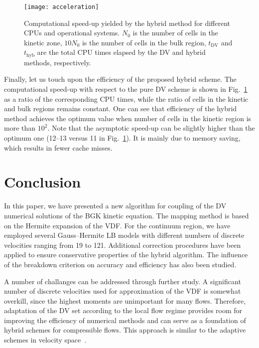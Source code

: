 \documentclass[]{elsarticle} %
\begin{document}
\begin{figure}
    \centering
    \texttt{[image: acceleration]}
    \caption{
        Computational speed-up yielded by the hybrid method for different CPUs and operational systems.
        $N_0$ is the number of cells in the kinetic zone, $10N_0$ is the number of cells in the bulk region,
        $t_\mathrm{DV}$ and $t_\mathrm{hyb}$ are the total CPU times elapsed by the DV and hybrid methods, respectively.
    }\label{fig:speed-up}
\end{figure}

Finally, let us touch upon the efficiency of the proposed hybrid scheme.
The computational speed-up with respect to the pure DV scheme is shown in Fig.~\ref{fig:speed-up} as a ratio of the corresponding CPU times,
while the ratio of cells in the kinetic and bulk regions remains constant.
One can see that efficiency of the hybrid method achieves the optimum value when number of cells in the kinetic region is more than $10^2$.
Note that the asymptotic speed-up can be slightly higher than the optimum one (12--13 versus 11 in Fig.~\ref{fig:speed-up}).
It is mainly due to memory saving, which results in fewer cache misses.

\section{Conclusion}\label{sec:summary}


In this paper, we have presented a new algorithm for coupling of the DV numerical solutions of the BGK kinetic equation.
The mapping method is based on the Hermite expansion of the VDF.
For the continuum region, we have employed several Gauss--Hermite LB models with different numbers of discrete velocities ranging from 19 to 121.
Additional correction procedures have been applied to ensure conservative properties of the hybrid algorithm.
The influence of the breakdown criterion on accuracy and efficiency has also been studied.

A number of challanges can be addressed through further study.
A significant number of discrete velocities used for approximation of the VDF is somewhat overkill,
since the highest moments are unimportant for many flows.
Therefore, adaptation of the DV set according to the local flow regime provides room for improving the efficiency of numerical methods
and can serve as a foundation of hybrid schemes for compressible flows.
This approach is similar to the adaptive schemes in velocity space~\cite{Aristov1977, Kolobov2013, Baranger2014}.
\end{document}
